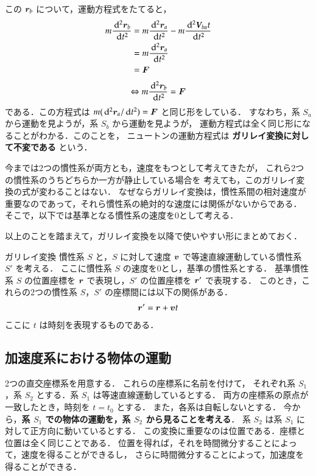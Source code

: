             この $\boldsymbol{r}_{b}$ について，運動方程式をたてると，
             \begin{align}
                m\frac{\,\mathrm{d}^{2}\boldsymbol{r}_{b}}{\,\mathrm{d} t^{2}}
                &=m\frac{\,\mathrm{d}^{2}\boldsymbol{r}_{a}}{\,\mathrm{d} t^{2}}-m\frac{\,\mathrm{d}^{2}\textit{\textbf{V}}_{ba}t}{\,\mathrm{d} t^{2}} \notag \\
                &=m\frac{\,\mathrm{d}^{2}\boldsymbol{r}_{a}}{\,\mathrm{d} t^{2}} \notag \\
                &=\boldsymbol{F}
            \end{align}
            \begin{align}
                \Leftrightarrow m\frac{\,\mathrm{d}^{2}\boldsymbol{r}_{b}}{\,\mathrm{d} t^{2}}=\boldsymbol{F}
            \end{align}
            である．この方程式は $m(\,\mathrm{d}^{2}\boldsymbol{r}_{a}/\,\mathrm{d} t^{2})=\boldsymbol{F}$
            と同じ形をしている．
            すなわち，系 $S_{a}$ から運動を見ようが，系 $S_{b}$ から運動を見ようが，
            運動方程式は全く同じ形になることがわかる．このことを，
            ニュートンの運動方程式は \textbf{ガリレイ変換に対して不変である} という．

            今までは2つの慣性系が両方とも，速度をもつとして考えてきたが，
            これら2つの慣性系のうちどちらか一方が静止している場合を
            考えても，このガリレイ変換の式が変わることはない．
            なぜならガリレイ変換は，慣性系間の相対速度が
            重要なのであって，それら慣性系の絶対的な速度には関係がないからである．
            そこで，以下では基準となる慣性系の速度を0として考える．

            以上のことを踏まえて，ガリレイ変換を以降で使いやすい形にまとめておく．
            \begin{myshadebox}{ガリレイ変換}
                慣性系 $S$ と，$S$ に対して速度 $\boldsymbol{v}$ で等速直線運動している慣性系 $S'$ を考える．
                ここに慣性系 $S$ の速度を0とし，基準の慣性系とする．
                基準慣性系 $S$ の位置座標を $\boldsymbol{r}$ で表現し，$S'$ の位置座標を $\boldsymbol{r}'$ で表現する．
                このとき，これらの2つの慣性系 $S$，$S'$ の座標間には以下の関係がある．
                \begin{align}
                    \boldsymbol{r}' =  \boldsymbol{r}+\boldsymbol{v} t
                \end{align}
                ここに $t$ は時刻を表現するものである．
            \end{myshadebox}

\subsection{加速度系における物体の運動}
                2つの直交座標系を用意する．
                これらの座標系に名前を付けて，
                それぞれ系 $S_{1}$，系 $S_{2}$ とする．系 $S_{1}$ は等速直線運動しているとする．
                両方の座標系の原点が一致したとき，時刻を $t=t_{0}$ とする．
                また，各系は自転しないとする．
                今から，\textbf{系 $S_{1}$ での物体の運動を，系 $S_{2}$ から見ることを考える}．
                系 $S_{2}$ は系 $S_{1}$ に対して正方向に動いているとする．
                この変換に重要なのは位置である．座標と位置は全く同じことである．
                 位置を得れば，それを時間微分することによって，速度を得ることができるし，
                さらに時間微分することによって，加速度を得ることができる．

